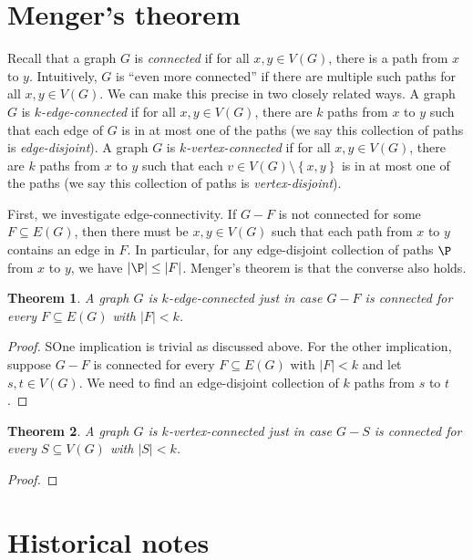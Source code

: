\documentclass[openany]{tufte-book} %
\theoremstyle{plain}
\newtheorem{theorem}{Theorem}
\newcommand{\set}[1]{\left\{ #1 \right\}}
\newcommand{\card}[1]{\left|#1\right|}
\begin{document}
\section{Menger's theorem}
Recall that a graph $G$ is \emph{connected} if for all $x,y \in V(G)$, there is a path from $x$ to $y$.  Intuitively, $G$ is ``even more connected'' if there are multiple such paths for all $x,y \in V(G)$.
We can make this precise in two closely related ways.  A graph $G$ is \emph{$k$-edge-connected} if for all $x,y \in V(G)$, there are $k$ paths from $x$ to $y$ such that each edge of $G$ is in at most 
one of the paths (we say this collection of paths is \emph{edge-disjoint}). A graph $G$ is \emph{$k$-vertex-connected} if for all $x,y \in V(G)$, there are $k$ paths from $x$ to $y$ 
such that each $v \in V(G) \setminus \set{x,y}$ is in at most one of the paths (we say this collection of paths is \emph{vertex-disjoint}).  

First, we investigate edge-connectivity. If $G-F$ is not connected for some $F \subseteq E(G)$, then there must be $x,y \in V(G)$ such that each path from $x$ to $y$ contains an edge in $F$.
In particular, for any edge-disjoint collection of paths $\P$ from $x$ to $y$, we have $\card{\P} \le \card{F}$.  Menger's theorem is that the converse also holds.

\begin{theorem}\label{MengerEdge}
A graph $G$ is $k$-edge-connected just in case $G - F$ is connected for every $F \subseteq E(G)$ with $\card{F} < k$.
\end{theorem}
\begin{proof}
SOne implication is trivial as discussed above.  For the other implication, suppose $G - F$ is connected for every $F \subseteq E(G)$ with $\card{F} < k$
and let $s,t \in V(G)$.  We need to find an edge-disjoint collection of $k$ paths from $s$ to $t$.
\end{proof}

\begin{theorem}\label{MengerVertex}
A graph $G$ is $k$-vertex-connected just in case $G - S$ is connected for every $S \subseteq V(G)$ with $\card{S} < k$.
\end{theorem}
\begin{proof}
\end{proof}

\section{Historical notes}
\end{document}
